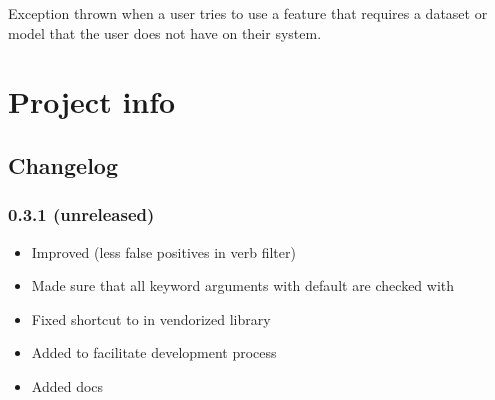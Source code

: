 \documentclass[letterpaper,10pt,english]{sphinxmanual}
\begin{document}
\begin{fulllineitems}
\label{api_reference:textblob.exceptions.MissingCorpusException}
Exception thrown when a user tries to use a feature that requires a
dataset or model that the user does not have on their system.

\end{fulllineitems}



\chapter{Project info}
\label{index:project-info}\label{index:id6}

\section{Changelog}
\label{changelog:id1}\label{changelog:changelog}\label{changelog::doc}

\subsection{0.3.1 (unreleased)}
\label{changelog:unreleased}\begin{itemize}
\item {} 
Improved  (less false positives in verb filter)

\item {} 
Made sure that all keyword arguments with default  are checked with 

\item {} 
Fixed shortcut to  in vendorized library

\item {} 
Added  to facilitate development process

\item {} 
Added docs

\end{itemize}
\end{document}
